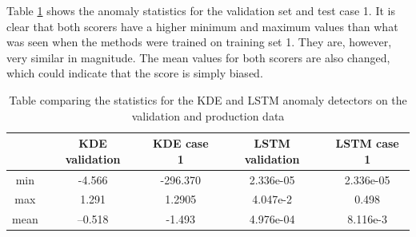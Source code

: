         Table \ref{tab:trainining_plant2_short_stats} shows the anomaly statistics for the validation set and test case 1. It is clear that both scorers have a higher minimum and maximum values than what was seen when the methods were trained on training set 1. They are, however, very similar in magnitude. The mean values for both scorers are also changed, which could indicate that the score is simply biased. 
        \begin{table}[]
            \centering
            \begin{tabular}{ccccc}
                \toprule
                            & \textbf{KDE validation}  & \textbf{KDE case 1}     & \textbf{LSTM validation}     & \textbf{LSTM case 1}   \\ \midrule
                min         & -4.566        & -296.370           & 2.336e-05            & 2.336e-05         \\ 
                max         & 1.291         & 1.2905             & 4.047e-2             & 0.498             \\ 
                mean        & --0.518       & -1.493             & 4.976e-04            & 8.116e-3          \\ \bottomrule
            \end{tabular}
            \caption{Table comparing the statistics for the KDE and LSTM anomaly detectors on the validation and production data}
            \label{tab:trainining_plant2_short_stats}
        \end{table}
